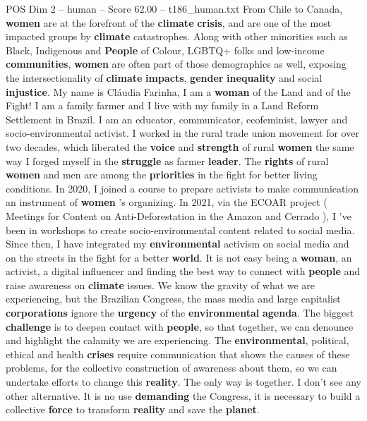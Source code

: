 \begin{textsample}{POS Dim 2 – human – Score 62.00 – t186\_human.txt}  \label{ex:f2_pos_022}
From Chile to Canada, \textbf{women} are at the forefront of the \textbf{climate} \textbf{crisis}, and are one of the most impacted groups by \textbf{climate} catastrophes.
Along with other minorities such as Black, Indigenous and \textbf{People} of Colour, LGBTQ+ folks and low-income \textbf{communities}, \textbf{women} are often part of those demographics as well, exposing the intersectionality of \textbf{climate} \textbf{impacts}, \textbf{gender} \textbf{inequality} and social \textbf{injustice}.
My name is Cláudia Farinha, I am a \textbf{woman} of the Land and of the Fight!
I am a family farmer and I live with my family in a Land Reform Settlement in Brazil.
I am an educator, communicator, ecofeminist, lawyer and socio-environmental activist.
I worked in the rural trade union movement for over two decades, which liberated the \textbf{voice} and \textbf{strength} of rural \textbf{women} the same way I forged myself in the \textbf{struggle} as farmer \textbf{leader}.
The \textbf{rights} of rural \textbf{women} and men are among the \textbf{priorities} in the fight for better living conditions.
In 2020, I joined a course to prepare activists to make communication an instrument of \textbf{women} ’s organizing.
In 2021, via the ECOAR project ( Meetings for Content on Anti-Deforestation in the Amazon and Cerrado ), I ’ve been in workshops to create socio-environmental content related to social media.
Since then, I have integrated my \textbf{environmental} activism on social media and on the streets in the fight for a better \textbf{world}.
It is not easy being a \textbf{woman}, an activist, a digital influencer and finding the best way to connect with \textbf{people} and raise awareness on \textbf{climate} issues.
We know the gravity of what we are experiencing, but the Brazilian Congress, the mass media and large capitalist \textbf{corporations} ignore the \textbf{urgency} of the \textbf{environmental} \textbf{agenda}.
The biggest \textbf{challenge} is to deepen contact with \textbf{people}, so that together, we can denounce and highlight the calamity we are experiencing.
The \textbf{environmental}, political, ethical and health \textbf{crises} require communication that shows the causes of these problems, for the collective construction of awareness about them, so we can undertake efforts to change this \textbf{reality}.
The only way is together.
I don't see any other alternative.
It is no use \textbf{demanding} the Congress, it is necessary to build a collective \textbf{force} to transform \textbf{reality} and save the \textbf{planet}.

\end{textsample}
